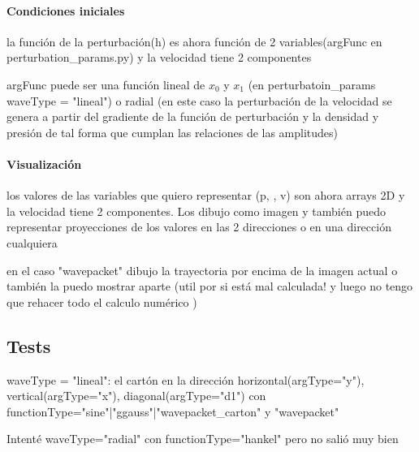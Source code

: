 \documentclass{article}
\begin{document}
\paragraph{Condiciones iniciales}
\begin{description}
\item la función de la perturbación(h) es ahora función de 2 variables(argFunc en perturbation\_params.py)  y la velocidad tiene 2 componentes
\item argFunc puede ser una función lineal de $x_0$ y $x_1$ (en perturbatoin\_params waveType = "lineal") o radial (en este caso la perturbación de la velocidad se genera a partir del gradiente de la función de perturbación y la densidad y presión  de tal forma que cumplan las relaciones de las amplitudes)

\end{description}
\paragraph{Visualización}
\begin{description}
\item los valores de las  variables que quiero representar (p, \rho , v) son ahora arrays 2D y la velocidad tiene 2 componentes. Los dibujo como imagen y también puedo representar proyecciones de los valores en las 2 direcciones o en una dirección cualquiera
\item en el caso "wavepacket" dibujo la trayectoria por encima de la imagen actual o también la puedo mostrar aparte (util por si está mal calculada! y luego no tengo que rehacer todo el calculo numérico )
\end{description}
	
\subsection{Tests}

\begin{description}
\item waveType = "lineal": el cartón en la dirección horizontal(argType="y"), vertical(argType="x"), diagonal(argType="d1") con functionType="sine"|"ggauss"|"wavepacket\_carton"  y "wavepacket"
\item Intenté waveType="radial" con functionType="hankel" pero no salió muy bien
\end{description}
\end{document}
